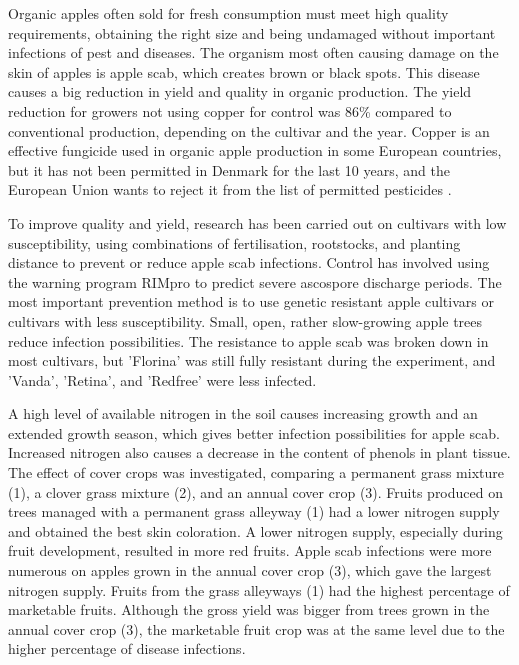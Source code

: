 Organic apples often sold for fresh consumption must meet high quality requirements, obtaining the right size and being undamaged without important infections of pest and diseases. The organism most often causing damage on the skin of apples is apple scab, which creates brown or black spots. This disease causes a big reduction in yield and quality in organic production. The yield reduction for growers not using copper for control was 86\% compared to conventional production, depending on the cultivar and the year. Copper is an effective fungicide used in organic apple production in some European countries, but it has not been permitted in Denmark for the last 10 years, and the European Union wants to reject it from the list of permitted pesticides \cite*{rm_10.1_L17-18_sustainable_production_organic_apple_production}.

\vspace{0.5em}
To improve quality and yield, research has been carried out on cultivars with low susceptibility, using combinations of fertilisation, rootstocks, and planting distance to prevent or reduce apple scab infections. Control has involved using the warning program RIMpro to predict severe ascospore discharge periods. The most important prevention method is to use genetic resistant apple cultivars or cultivars with less susceptibility. Small, open, rather slow-growing apple trees reduce infection possibilities. The resistance to apple scab was broken down in most cultivars, but 'Florina' was still fully resistant during the experiment, and 'Vanda', 'Retina', and 'Redfree' were less infected.

\vspace{0.5em}
A high level of available nitrogen in the soil causes increasing growth and an extended growth season, which gives better infection possibilities for apple scab. Increased nitrogen also causes a decrease in the content of phenols in plant tissue. The effect of cover crops was investigated, comparing a permanent grass mixture (1), a clover grass mixture (2), and an annual cover crop (3). Fruits produced on trees managed with a permanent grass alleyway (1) had a lower nitrogen supply and obtained the best skin coloration. A lower nitrogen supply, especially during fruit development, resulted in more red fruits. Apple scab infections were more numerous on apples grown in the annual cover crop (3), which gave the largest nitrogen supply. Fruits from the grass alleyways (1) had the highest percentage of marketable fruits. Although the gross yield was bigger from trees grown in the annual cover crop (3), the marketable fruit crop was at the same level due to the higher percentage of disease infections.

